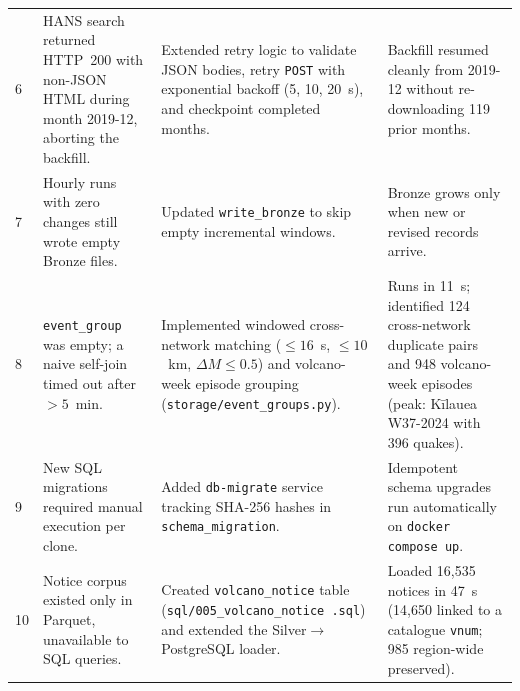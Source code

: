 \documentclass[11pt,a4paper]{article}
\begin{document}
\begin{longtable}{L{0.5cm}L{4.4cm}L{4.8cm}L{4.6cm}}
6 & HANS search returned HTTP~200 with non-JSON HTML during month 2019-12, aborting the backfill. & Extended retry logic to validate JSON bodies, retry \texttt{POST} with exponential backoff (5, 10, 20~s), and checkpoint completed months. & Backfill resumed cleanly from 2019-12 without re-downloading 119 prior months.\\
7 & Hourly runs with zero changes still wrote empty Bronze files. & Updated \texttt{write\_bronze} to skip empty incremental windows. & Bronze grows only when new or revised records arrive.\\
8 & \texttt{event\_group} was empty; a naive self-join timed out after $>5$~min. & Implemented windowed cross-network matching ($\le 16$~s, $\le 10$~km, $\Delta M \le 0.5$) and volcano-week episode grouping (\texttt{storage/event\_groups.py}). & Runs in 11~s; identified 124 cross-network duplicate pairs and 948 volcano-week episodes (peak: Kīlauea W37-2024 with 396 quakes).\\
9 & New SQL migrations required manual execution per clone. & Added \texttt{db-migrate} service tracking SHA-256 hashes in \texttt{schema\_migration}. & Idempotent schema upgrades run automatically on \texttt{docker compose up}.\\
10 & Notice corpus existed only in Parquet, unavailable to SQL queries. & Created \texttt{volcano\_notice} table (\texttt{sql/005\_volcano\_notice .sql}) and extended the Silver$\to$PostgreSQL loader. & Loaded 16,535 notices in 47~s (14,650 linked to a catalogue \texttt{vnum}; 985 region-wide preserved).\\
\bottomrule
\end{longtable}
\end{document}
